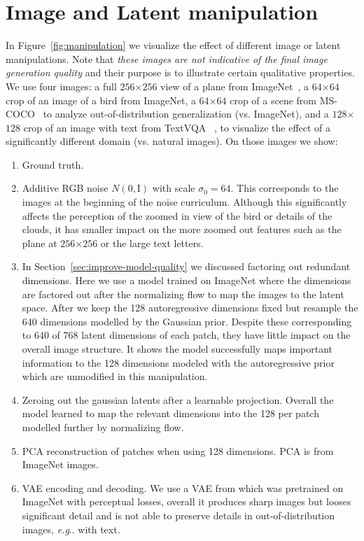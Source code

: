 \documentclass{article} %
\makeatletter
\DeclareRobustCommand\onedot{\futurelet\@let@token\@onedot}
\def\@onedot{\ifx\@let@token.\else.\null\fi\xspace}
\def\eg{\emph{e.g}\onedot} \def\Eg{\emph{E.g}\onedot}
\makeatother
\begin{document}
\clearpage
\section{Image and Latent manipulation}

In Figure~\ref{fig:manipulation} we visualize the effect of different image or latent manipulations.
Note that \emph{these images are not indicative of the final image generation quality} and their purpose is to illustrate
certain qualitative properties. We use four images: a full $256$$\times$$256$ view of a plane from ImageNet~\citep{russakovsky2015imagenet}, a $64$$\times$$64$ crop of an image of a bird from ImageNet, a $64$$\times$$64$ crop of a scene from MS-COCO~\citep{coco2014} to analyze out-of-distribution generalization (vs. ImageNet), and a $128$$\times$$128$ crop of an image with text from TextVQA
~\citep{singh2019towards-textvqa}, to visualize the effect of a significantly different domain (vs. natural images). On those images we show:

\begin{enumerate}[label=(\alph*),leftmargin=*]
    \item Ground truth.
    \item Additive RGB noise $N(0, \mathrm{I})$ with scale $\sigma_0=64$. This corresponds to the images at the beginning of the noise curriculum. Although this significantly affects the perception of the zoomed in view of the bird or details of the clouds, it has smaller impact on the more zoomed out features such as the plane at $256$$\times$$256$ or the large text letters.
    \item In Section~\ref{sec:improve-model-quality} we discussed factoring out redundant dimensions. Here we use a model trained on ImageNet where the dimensions are factored out after the normalizing flow to map the images to the latent space. After we keep the 128 autoregressive dimensions fixed but resample the 640 dimensions modelled by the Gaussian prior. %
    Despite these corresponding to 640 of 768 latent dimensions of each patch, they have little impact on the overall image structure. It shows the model successfully maps important information to the 128 dimensions modeled with the autoregressive prior which are unmodified in this manipulation.
    \item Zeroing out the gaussian latents after a learnable projection. Overall the model learned to map the relevant dimensions into the 128 per patch modelled further by normalizing flow.
    \item PCA reconstruction of patches when using 128 dimensions. PCA is from ImageNet images.
    \item VAE encoding and decoding. We use a VAE from \citep{tschannen2023givt} which was pretrained on ImageNet with perceptual losses, overall it produces sharp images but looses significant detail and is not able to preserve details in out-of-distribution images, \eg{} with text.
\end{enumerate}
\end{document}
